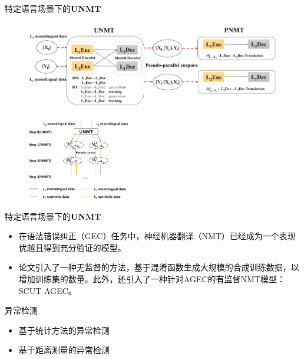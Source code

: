 \documentclass[UTF8]{beamer}
\begin{document}
\begin{frame}{特定语言场景下的\textbf{UNMT}}
    \begin{figure}[H]
        \centering
        \includegraphics[width=\textwidth]{img/3-Language Translation/1 .png}
    \end{figure}

    
    \begin{figure}[H]
        \centering
        \includegraphics[width=0.4\textwidth]{img/3-Language Translation/2 .png}
    \end{figure}
\end{frame}

\begin{frame}{特定语言场景下的\textbf{UNMT}}
    \begin{itemize}
        \item 在语法错误纠正（GEC）任务中，神经机器翻译（NMT）已经成为一个表现优越且得到充分验证的模型。
        \item 论文引入了一种无监督的方法，基于混淆函数生成大规模的合成训练数据，以增加训练集的数量。此外，还引入了一种针对AGEC的有监督NMT模型：SCUT AGEC。
    \end{itemize}
\end{frame}

\begin{frame}{异常检测}
    \begin{itemize}
        \item 基于统计方法的异常检测
        \item 基于距离测量的异常检测
    \end{itemize}
\end{frame}
\end{document}
